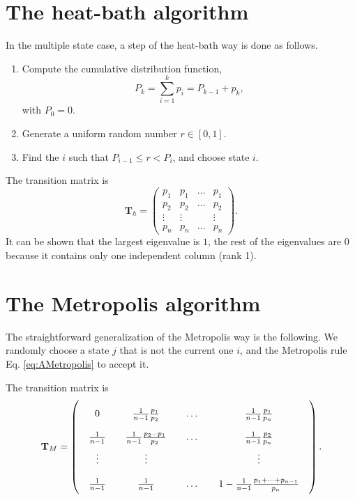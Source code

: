 \documentclass[12pt]{article}
\begin{document}
\section{The heat-bath algorithm}

In the multiple state case,
a step of the heat-bath way is done as follows.
%
\begin{enumerate}
  \item Compute the cumulative distribution function,
    $$
    P_k = \sum_{i=1}^k p_i = P_{k-1} + p_k,
    $$
    with $P_0 = 0$.
  \item Generate a uniform random number $r \in [0, 1]$.
  \item Find the $i$ such that $P_{i-1} \le r < P_i$,
    and choose state $i$.
\end{enumerate}

The transition matrix is
$$
\mathbf T_h =
\left(
  \begin{array}{cccccc}
    p_1 & p_1 & \dots & p_1 \\
    p_2 & p_2 & \dots & p_2 \\
    \vdots & \vdots  &  & \vdots \\
    p_n & p_n & \dots & p_n
  \end{array}
\right).
$$
It can be shown that
the largest eigenvalue is $1$, the rest of the eigenvalues are $0$
because it contains only one independent column (rank 1).



\section{The Metropolis algorithm}


The straightforward generalization of the Metropolis way is the following.
We randomly choose a state $j$ that is not the current one $i$,
and the Metropolis rule Eq. \eqref{eq:AMetropolis} to accept it.

The transition matrix is
$$
\mathbf T_M =
\left(
  \arraycolsep=10.0pt\def\arraystretch{2.0}
  \begin{array}{cccccc}
    0   & \frac{1}{n-1}\frac{p_1}{p_2} & \dots & \frac{1}{n-1}\frac{p_1}{p_n} \\
    \frac{1}{n-1} & \frac{1}{n-1}\frac{p_2-p_1}{p_2} & \dots & \frac{1}{n-1}\frac{p_2}{p_n} \\
    \vdots & \vdots  &  & \vdots \\
    \frac{1}{n-1} & \frac{1}{n-1} & \dots & 1 - \frac{1}{n-1}\frac{p_1 + \cdots + p_{n-1}}{p_n}
  \end{array}
\right).
$$
\end{document}
